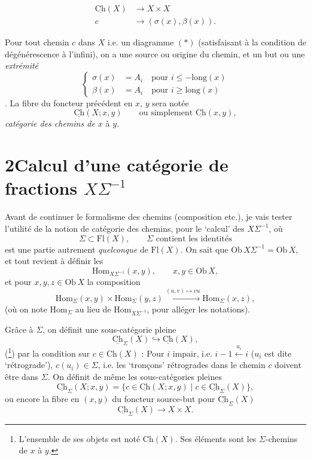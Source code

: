 \documentclass[11pt]{article}
\newcommand{\printedpage}[1]{\marginpar{\footnotesize p.~#1}}
\newcommand{\msp}[1]{\marginpar{\footnotesize [#1]}}
\newcommand{\Hom}{\mathrm{Hom}}
\newcommand{\uCh}{\underline{\mathrm{Ch}}}
\begin{document}
\msp{page 5}
\[
\begin{aligned}
\uCh(X) &\longrightarrow X\times X\\
c &\longrightarrow (\sigma(x),\beta(x)).
\end{aligned}
\]

 Pour tout chemin $c$ dans $X$ i.e. un diagramme $(*)$ (satisfaisant à la condition de dégénérescence à l'infini), on a une source ou origine du chemin, et un but ou une \textit{extrémité}
\[
\left\{
\begin{aligned}
\sigma(x) &= A_i\quad\text{pour } i\leq -\mathrm{long}(x)\\
\beta(x) &= A_i\quad\text{pour } i\geq \mathrm{long}(x)
\end{aligned}
\right.
\]
. La fibre du foncteur précédent en $x$, $y$ sera notée
\[
\uCh(X;x,y)\qquad\text{ou simplement }\uCh(x,y),
\]
\textit{catégorie des chemins de $x$} à \textit{$y$.}

\printedpage{5}

\section*{2\quad Calcul d'une catégorie de fractions $X\Sigma^{-1}$}

Avant de continuer le formalisme des chemins (composition etc.), je vais tester l'utilité de la notion de catégorie des chemins, pour le `calcul' des $X\Sigma^{-1}$, où
\[
\Sigma\subset\mathrm{Fl}(X),\qquad\Sigma\text{ contient les identités}
\]
est une partie autrement \textit{quelconque} de $\mathrm{Fl}(X)$. On sait que $\mathrm{Ob}\,X\Sigma^{-1}=\mathrm{Ob}\,X$, et tout revient à définir les
\[
\Hom_{X\Sigma^{-1}}(x,y),\qquad x,y\in\mathrm{Ob}\,X,
\]
\msp{page 6}
et pour $x,y,z\in\mathrm{Ob}\,X$ la composition
\[
\Hom_\Sigma(x,y)\times\Hom_\Sigma(y,z)\xrightarrow{(u,v)\mapsto vu}\Hom_\Sigma(x,z),
\]
(où on note $\Hom_\Sigma$ au lieu de $\Hom_{X\Sigma^{-1}}$, pour alléger les notations).

Grâce à $\Sigma$, on définit une sous-catégorie pleine
\[
\uCh_\Sigma(X)\hookrightarrow\uCh(X),
\]
(\footnote[3]{L'ensemble de ses objets est noté $\mathrm{Ch}(X)$. Ses éléments sont les $\Sigma$-chemins de $x$ à $y$.}) par la condition sur $c\in\mathrm{Ch}(X)$ : Pour $i$ impair, i.e. $i-1\xleftarrow{u_i}i$ ($u_i$ est dite `rétrograde'), $c(u_i)\in\Sigma$, i.e. les `tronçons' rétrogrades dans le chemin $c$ doivent être dans $\Sigma$. On définit de même les sous-catégories pleines
\[
\uCh_\Sigma(X;x,y)=\{c\in\uCh(X;x,y)\mid c\in\uCh_\Sigma(X)\},
\]
ou encore la fibre en $(x,y)$ du foncteur source-but pour $\uCh_\Sigma(X)$
\[
\uCh_\Sigma(X)\longrightarrow X\times X.
\]
\end{document}
